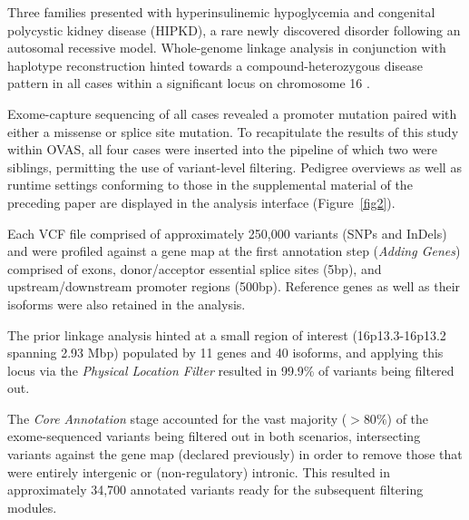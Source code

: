 \documentclass[twocolumn]{bmcart}%
\def\app{OVAS}
\begin{document}
Three families presented with hyperinsulinemic hypoglycemia and congenital polycystic kidney disease (HIPKD), a rare newly discovered disorder following an autosomal recessive model. Whole-genome linkage analysis in conjunction with haplotype reconstruction hinted towards a compound-heterozygous disease pattern in all cases within a significant locus on chromosome 16 \cite{cabezas2017polycystic}.

Exome-capture sequencing of all cases revealed a promoter mutation paired with either a missense or splice site mutation. To recapitulate the results of this study within \app{}, all four cases were inserted into the pipeline of which two were siblings, permitting the use of variant-level filtering. Pedigree overviews as well as runtime settings conforming to those in the supplemental material of the preceding paper are displayed in the analysis interface (Figure~\ref{fig2}).


Each VCF file comprised of approximately 250,000 variants (SNPs and InDels) and were profiled against a gene map at the first annotation step (\textit{Adding Genes}) comprised of exons, donor/acceptor essential splice sites (5bp), and upstream/downstream promoter regions (500bp). Reference genes as well as their isoforms were also retained in the analysis.

The prior linkage analysis \cite{cabezas2017polycystic} hinted at a small region of interest (16p13.3-16p13.2 spanning 2.93 Mbp) populated by 11 genes and 40 isoforms, and applying this locus via the \textit{Physical Location Filter} resulted in 99.9\% of variants being filtered out.


The \textit{Core Annotation} stage accounted for the vast majority ($ > 80\% $) of the exome-sequenced variants being filtered out in both scenarios, intersecting variants against the gene map (declared previously) in order to remove those that were entirely intergenic or (non-regulatory) intronic. This resulted in approximately 34,700 annotated variants ready for the subsequent filtering modules.
\end{document}
